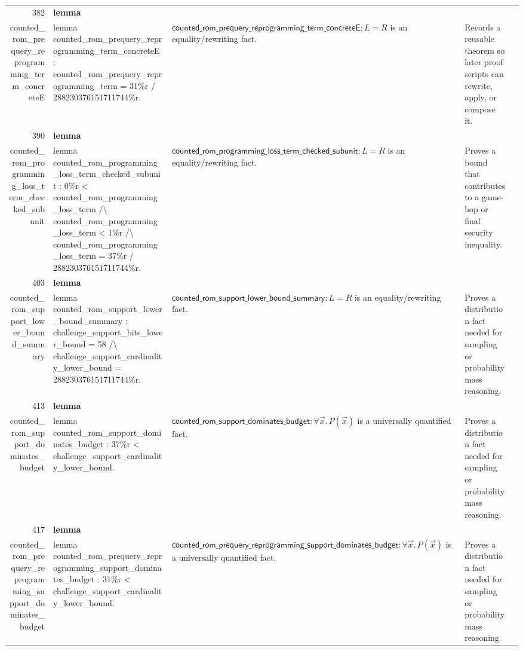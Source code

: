 \documentclass[10pt]{article}
\newcommand{\ec}[1]{\begingroup\ttfamily\scriptsize #1\endgroup}
\begin{document}
\begin{longtable}{r L{0.17\textwidth} L{0.26\textwidth} L{0.27\textwidth} L{0.20\textwidth}}
382 & \textbf{lemma}\\\ec{counted\_rom\_prequery\_reprogramming\_term\_concreteE} & \ec{lemma counted\_rom\_prequery\_reprogramming\_term\_concreteE : counted\_rom\_prequery\_reprogramming\_term = 31\%r / 288230376151711744\%r.} & \(\mathsf{counted\_rom\_prequery\_reprogramming\_term\_concreteE} : L = R\) is an equality/rewriting fact. & Records a reusable theorem so later proof scripts can rewrite, apply, or compose it. \\
390 & \textbf{lemma}\\\ec{counted\_rom\_programming\_loss\_term\_checked\_subunit} & \ec{lemma counted\_rom\_programming\_loss\_term\_checked\_subunit : 0\%r < counted\_rom\_programming\_loss\_term /\textbackslash{} counted\_rom\_programming\_loss\_term < 1\%r /\textbackslash{} counted\_rom\_programming\_loss\_term = 37\%r / 288230376151711744\%r.} & \(\mathsf{counted\_rom\_programming\_loss\_term\_checked\_subunit} : L = R\) is an equality/rewriting fact. & Proves a bound that contributes to a game-hop or final security inequality. \\
403 & \textbf{lemma}\\\ec{counted\_rom\_support\_lower\_bound\_summary} & \ec{lemma counted\_rom\_support\_lower\_bound\_summary : challenge\_support\_bits\_lower\_bound = 58 /\textbackslash{} challenge\_support\_cardinality\_lower\_bound = 288230376151711744\%r.} & \(\mathsf{counted\_rom\_support\_lower\_bound\_summary} : L = R\) is an equality/rewriting fact. & Proves a distribution fact needed for sampling or probability mass reasoning. \\
413 & \textbf{lemma}\\\ec{counted\_rom\_support\_dominates\_budget} & \ec{lemma counted\_rom\_support\_dominates\_budget : 37\%r < challenge\_support\_cardinality\_lower\_bound.} & \(\mathsf{counted\_rom\_support\_dominates\_budget} : \forall \vec{x}.\, P(\vec{x})\) is a universally quantified fact. & Proves a distribution fact needed for sampling or probability mass reasoning. \\
417 & \textbf{lemma}\\\ec{counted\_rom\_prequery\_reprogramming\_support\_dominates\_budget} & \ec{lemma counted\_rom\_prequery\_reprogramming\_support\_dominates\_budget : 31\%r < challenge\_support\_cardinality\_lower\_bound.} & \(\mathsf{counted\_rom\_prequery\_reprogramming\_support\_dominates\_budget} : \forall \vec{x}.\, P(\vec{x})\) is a universally quantified fact. & Proves a distribution fact needed for sampling or probability mass reasoning. \\

\end{longtable}
\end{document}
